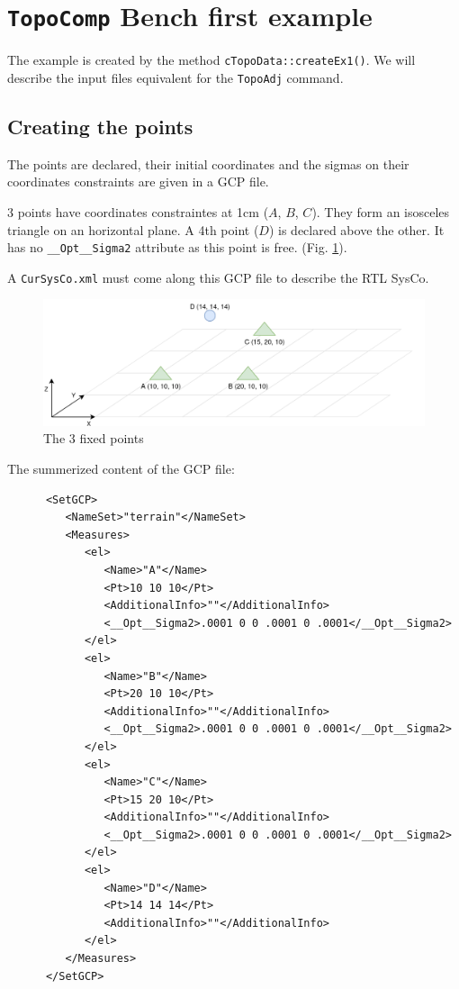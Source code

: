 \section{\texttt{TopoComp} Bench first example}
\label{subsec:topoBench}

The example is created by the method \texttt{cTopoData::createEx1()}.
We will describe the input files equivalent for the \texttt{TopoAdj} command.


\subsection{Creating the points}

The points are declared, their initial coordinates and the sigmas on their coordinates constraints
are given in a GCP file. 

3 points have coordinates constraintes at 1cm ($A$, $B$, $C$). They form an isosceles triangle
on an horizontal plane.
A 4th point ($D$) is declared above the other. It has no {\tt \_\_Opt\_\_Sigma2} attribute as this point is free.
(Fig. \ref{fig:topoEx1}).

A {\tt CurSysCo.xml} must come along this GCP file to describe the RTL SysCo.

\begin{figure}[!h]
\centering
\includegraphics[width=12cm]{Programmer/benchtopo1b.png}
\caption{The 3 fixed points}
\label{fig:topoEx1}
\end{figure}

The summerized content of the GCP file:

\begin{lstlisting}
      <SetGCP>
         <NameSet>"terrain"</NameSet>
         <Measures>
            <el>
               <Name>"A"</Name>
               <Pt>10 10 10</Pt>
               <AdditionalInfo>""</AdditionalInfo>
               <__Opt__Sigma2>.0001 0 0 .0001 0 .0001</__Opt__Sigma2>
            </el>
            <el>
               <Name>"B"</Name>
               <Pt>20 10 10</Pt>
               <AdditionalInfo>""</AdditionalInfo>
               <__Opt__Sigma2>.0001 0 0 .0001 0 .0001</__Opt__Sigma2>
            </el>
            <el>
               <Name>"C"</Name>
               <Pt>15 20 10</Pt>
               <AdditionalInfo>""</AdditionalInfo>
               <__Opt__Sigma2>.0001 0 0 .0001 0 .0001</__Opt__Sigma2>
            </el>
            <el>
               <Name>"D"</Name>
               <Pt>14 14 14</Pt>
               <AdditionalInfo>""</AdditionalInfo>
            </el>
         </Measures>
      </SetGCP>
\end{lstlisting}


